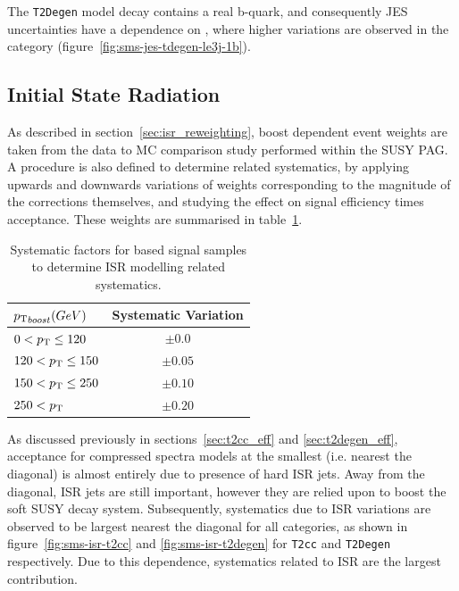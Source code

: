 The \texttt{T2Degen} model decay contains a real b-quark, and consequently JES 
uncertainties have a dependence on \nb, where higher variations are observed in 
the  category (figure~\ref{fig:sms-jes-tdegen-le3j-1b}).


\subsection{Initial State Radiation}
As described in section~\ref{sec:isr_reweighting}, boost \Pt dependent 
event weights are taken from the data to MC comparison study performed within
the SUSY PAG. A procedure is also defined to determine related systematics, by
applying upwards and downwards variations of weights corresponding to the 
magnitude of the corrections themselves, and studying the effect on signal 
efficiency times acceptance. These weights are summarised in
table~\ref{tab:isr_syst_weights}.

\begin{table}[ht!]
  \caption{Systematic factors for \MADGRAPH based signal samples to determine 
  ISR modelling related systematics.\label{tab:isr_syst_weights}}
  \centering
  \small
  \begin{tabular}{ lc }
    \hline
    \hline
    ${p_{\text T}}_{boost} (GeV)$         & Systematic Variation \\
    \hline
    $0 <{p_{\text T}}\leq120    $          & $\pm0.0$ \\
    $120 <{p_{\text T}}\leq150  $          & $\pm0.05$ \\
    $150 <{p_{\text T}}\leq250  $          & $\pm0.10$ \\
    $250 < {p_{\text T}}        $          & $\pm0.20$ \\    
    \hline
    \hline
  \end{tabular}
\end{table}

As discussed previously in sections~\ref{sec:t2cc_eff} and \ref{sec:t2degen_eff},
acceptance for compressed spectra models at the smallest \deltam (i.e. nearest 
the diagonal) is almost entirely due to presence of hard ISR jets. Away from the
diagonal, ISR jets are still important, however they are relied upon to boost 
the soft SUSY decay system. Subsequently, systematics due to ISR variations are 
observed to be largest nearest the diagonal for all categories, as shown in
figure~\ref{fig:sms-isr-t2cc} and \ref{fig:sms-isr-t2degen} for \texttt{T2cc} 
and \texttt{T2Degen} respectively. Due to this dependence, systematics related 
to ISR are the largest contribution.



